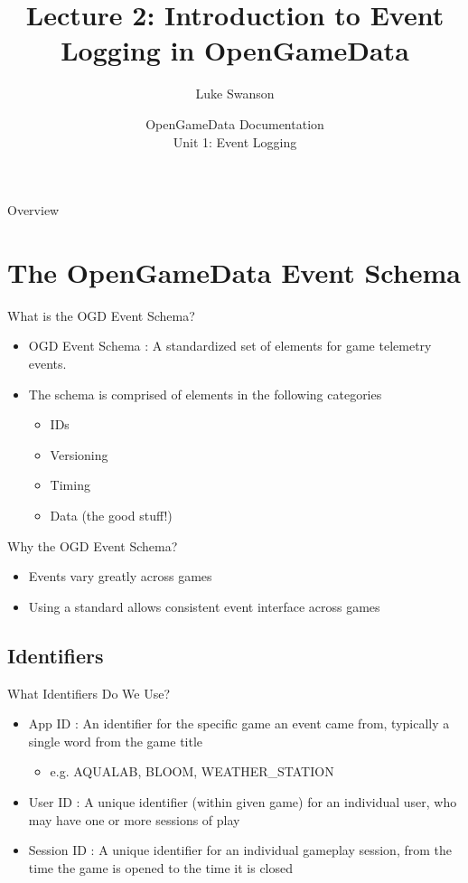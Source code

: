 \documentclass{beamer}
\title[Intro to Events] %
{Lecture 2: Introduction to Event Logging in OpenGameData}
\author[Swanson] %
{Luke Swanson}
\institute[University of Wisconsin-Madison] %
{
  Field Day Lab\\
  University of Wisconsin-Madison
}
\date[OGD Docs] %
{OpenGameData Documentation \\ Unit 1: Event Logging}
\begin{document}
\begin{frame}
  \titlepage
\end{frame}

\begin{frame}{Overview}
  \tableofcontents
\end{frame}

\section[Event Schema]{The OpenGameData Event Schema}

\begin{frame}{What is the OGD Event Schema?}
  \begin{itemize}
    \item \alert{OGD Event Schema :} A standardized set of elements for game telemetry events.
    \item The schema is comprised of elements in the following categories
    \begin{itemize}
      \item IDs
      \item Versioning
      \item Timing
      \item Data (the good stuff!)
    \end{itemize}
  \end{itemize}
\end{frame}

\begin{frame}{Why the OGD Event Schema?}
  \begin{itemize}
    \item Events vary greatly across games
    \item Using a standard allows consistent event interface across games
  \end{itemize}
\end{frame}

\subsection[IDs]{Identifiers}

\begin{frame}{What Identifiers Do We Use?}
  \begin{itemize}
    \item \alert{App ID :} An identifier for the specific game an event came from, typically a single word from the game title
    \begin{itemize}
      \item e.g. AQUALAB, BLOOM, WEATHER\_STATION
    \end{itemize}
    \item \alert{User ID :} A unique identifier (within given game) for an individual user, who may have one or more sessions of play
    \item \alert{Session ID :} A unique identifier for an individual gameplay session, from the time the game is opened to the time it is closed
  \end{itemize}
\end{frame}
\end{document}
